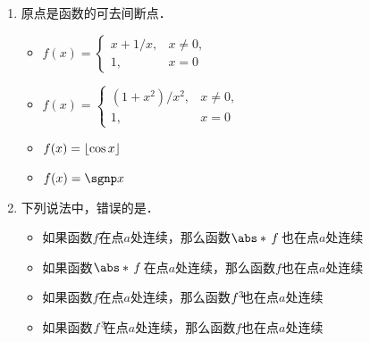 \documentclass[a4paper,punct=CCT]{ctexbook}
\theoremstyle{definition}
\theoremstyle{remark}
\newif\ifshowsol
\begin{document}
\begin{enumerate}
\item 原点是函数\uline{\makebox[6em]{}}的可去间断点．
  \begin{itemize}
    \renewcommand{\labelitemi}{\faCircleThin}
  \item
    \begin{math}
      f(x) =
      \begin{cases}
        x + 1/x, & x \ne 0, \\
        1, & x = 0
      \end{cases}
    \end{math}
  \item
    \begin{math}
      f(x) =
      \begin{cases}
        (1+x^2)/x^2, & x \ne 0, \\
        1, & x = 0
      \end{cases}
    \end{math}
    \ifshowsol
  \item[\faCircle]
    \else
  \item
    \fi
    \(f(x) = \lfloor\cos x\rfloor\)
  \item \(f(x) = \sgnp x\)
  \end{itemize}

  \ifshowsol
  原点分别是选项A、B中函数的第二类间断点、选项C中函数的可去间断点、选项D中的跳跃间断点．
  \fi

\item 下列说法中，错误的是\uline{\makebox[10em]{}}．
  \begin{itemize}
    \renewcommand{\labelitemi}{\faCircleThin}
  \item 如果函数\(f\)在点\(a\)处连续，那么函数\(\abs*{\,f\,}\)也在点\(a\)处连续
    \ifshowsol
  \item[\faCircle]
    \else
  \item
    \fi
    如果函数\(\abs*{\,f\,}\)在点\(a\)处连续，那么函数\(f\)也在点\(a\)处连续
  \item 如果函数\(f\)在点\(a\)处连续，那么函数\(f^3\negthickspace\)也在点\(a\)处连续
  \item 如果函数\(f^3\negthickspace\)在点\(a\)处连续，那么函数\(f\)也在点\(a\)处连续
  \end{itemize}

  \ifshowsol
  由于反三角不等式，选项A成立；由于定理\ref{thm:contcomp}，选项C和D成立．选项B的一个反例是函数\(2\fn H - 1\)，其中\(H\)是阶跃函数（定义\ref{defn:heaviside}）．
  \fi


\end{enumerate}
\end{document}
